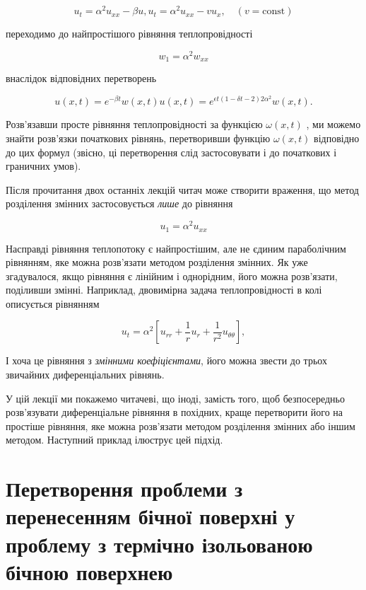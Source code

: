 \documentclass[
  ukrainian,
]{article}
\begin{document}
\[
u_t = \alpha^2 u_{xx} - \beta u,
u_t = \alpha^2 u_{xx} - v u_x, \quad (v = \text{const})
\]

переходимо до найпростішого рівняння теплопровідності

\[
w_1 = \alpha^2 w_{xx}
\]

внаслідок відповідних перетворень

\[
u(x, t) = e^{-\beta t} w(x, t)
u(x, t) = e^{\epsilon t (1 - \delta t - 2) 2\alpha^2} w(x, t).
\]

Розв'язавши просте рівняння теплопровідності за функцією \(\omega(x,t)\)
, ми можемо знайти розв'язки початкових рівнянь, перетворивши функцію
\(\omega(x,t)\) відповідно до цих формул (звісно, ці перетворення слід
застосовувати і до початкових і граничних умов).

Після прочитання двох останніх лекцій читач може створити враження, що
метод розділення змінних застосовується \emph{лише} до рівняння

\[
u_1 = \alpha^2 u_{xx}
\]

Насправді рівняння теплопотоку є найпростішим, але не єдиним
параболічним рівнянням, яке можна розв'язати методом розділення змінних.
Як уже згадувалося, якщо рівняння є лінійним і однорідним, його можна
розв'язати, поділивши змінні. Наприклад, двовимірна задача
теплопровідності в колі описується рівнянням

\[
u_t = \alpha^2 \left[ u_{rr} + \frac{1}{r} u_r + \frac{1}{r^2} u_{\theta\theta} \right],
\]

І хоча це рівняння з \emph{змінними коефіцієнтами}, його можна звести до
трьох звичайних диференціальних рівнянь.

У цій лекції ми покажемо читачеві, що іноді, замість того, щоб
безпосередньо розв'язувати диференціальне рівняння в похідних, краще
перетворити його на простіше рівняння, яке можна розв'язати методом
розділення змінних або іншим методом. Наступний приклад ілюструє цей
підхід.

\section{Перетворення проблеми з перенесенням бічної поверхні у проблему
з термічно ізольованою бічною
поверхнею}\label{ux43fux435ux440ux435ux442ux432ux43eux440ux435ux43dux43dux44f-ux43fux440ux43eux431ux43bux435ux43cux438-ux437-ux43fux435ux440ux435ux43dux435ux441ux435ux43dux43dux44fux43c-ux431ux456ux447ux43dux43eux457-ux43fux43eux432ux435ux440ux445ux43dux456-ux443-ux43fux440ux43eux431ux43bux435ux43cux443-ux437-ux442ux435ux440ux43cux456ux447ux43dux43e-ux456ux437ux43eux43bux44cux43eux432ux430ux43dux43eux44e-ux431ux456ux447ux43dux43eux44e-ux43fux43eux432ux435ux440ux445ux43dux435ux44e}
\end{document}
